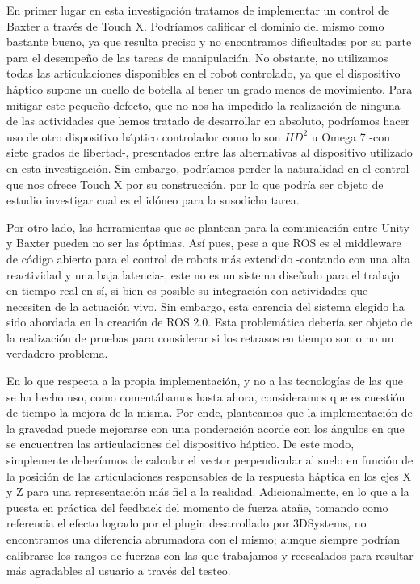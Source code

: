 En primer lugar en esta investigación tratamos de implementar un control de Baxter a través de Touch X. Podríamos calificar el dominio del mismo como bastante bueno, ya que resulta preciso y no encontramos dificultades por su parte para el desempeño de las tareas de manipulación. No obstante, no utilizamos todas las articulaciones disponibles en el robot controlado, ya que el dispositivo háptico supone un cuello de botella al tener un grado menos de movimiento. Para mitigar este pequeño defecto, que no nos ha impedido la realización de ninguna de las actividades que hemos tratado de desarrollar en absoluto, podríamos hacer uso de otro dispositivo háptico controlador como lo son $HD^2$ u Omega 7 -con siete grados de libertad-, presentados entre las alternativas al dispositivo utilizado en esta investigación. Sin embargo, podríamos perder la naturalidad en el control que nos ofrece Touch X por su construcción, por lo que podría ser objeto de estudio investigar cual es el idóneo para la susodicha tarea.

Por otro lado, las herramientas que se plantean para la comunicación entre Unity y Baxter pueden no ser las óptimas. Así pues, pese a que ROS es el middleware de código abierto para el control de robots más extendido -contando con una alta reactividad y una baja latencia-, este no es un sistema diseñado para el trabajo en tiempo real en sí, si bien es posible su integración con actividades que necesiten de la actuación vivo. Sin embargo, esta carencia del sistema elegido ha sido abordada en la creación de ROS 2.0. Esta problemática debería ser objeto de la realización de pruebas para considerar si los retrasos en tiempo son o no un verdadero problema.

En lo que respecta a la propia implementación, y no a las tecnologías de las que se ha hecho uso, como comentábamos hasta ahora, consideramos que es cuestión de tiempo la mejora de la misma. Por ende, planteamos que la implementación de la gravedad puede mejorarse con una ponderación acorde con los ángulos en que se encuentren las articulaciones del dispositivo háptico. De este modo, simplemente deberíamos de calcular el vector perpendicular al suelo en función de la posición de las articulaciones responsables de la respuesta háptica en los ejes X y Z para una representación más fiel a la realidad. Adicionalmente, en lo que a la puesta en práctica del feedback del momento de fuerza atañe, tomando como referencia el efecto logrado por el plugin desarrollado por 3DSystems, no encontramos una diferencia abrumadora con el mismo; aunque siempre podrían calibrarse los rangos de fuerzas con las que trabajamos  y reescalados para resultar más agradables al usuario a través del testeo.

